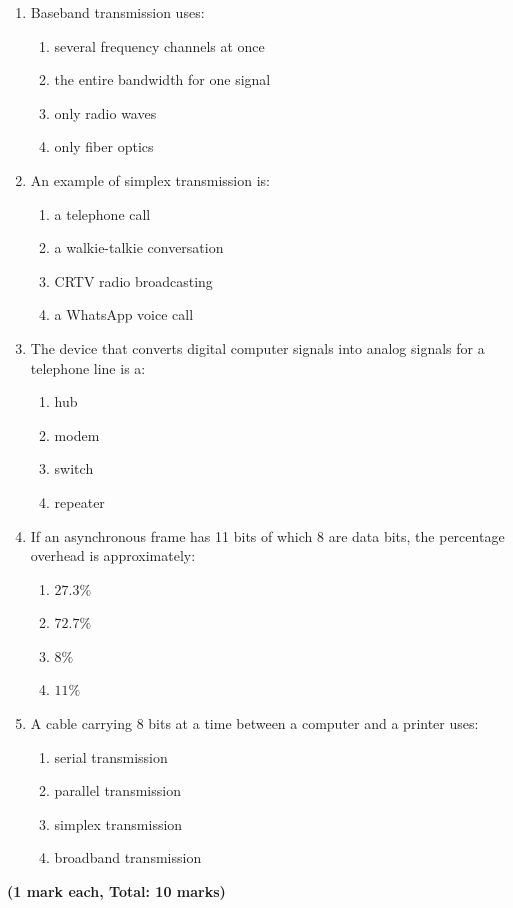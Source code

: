 \documentclass[11pt]{article}
\begin{document}
\begin{exercice}
\begin{enumerate}
\item Baseband transmission uses:
\begin{enumerate}
\item several frequency channels at once
\item the entire bandwidth for one signal
\item only radio waves
\item only fiber optics
\end{enumerate}
\item An example of simplex transmission is:
\begin{enumerate}
\item a telephone call \item a walkie-talkie conversation \item CRTV radio broadcasting \item a WhatsApp voice call
\end{enumerate}
\item The device that converts digital computer signals into analog signals for a telephone line is a:
\begin{enumerate}
\item hub \item modem \item switch \item repeater
\end{enumerate}
\item If an asynchronous frame has 11 bits of which 8 are data bits, the percentage overhead is approximately:
\begin{enumerate}
\item $27.3\%$ \item $72.7\%$ \item $8\%$ \item $11\%$
\end{enumerate}
\item A cable carrying 8 bits at a time between a computer and a printer uses:
\begin{enumerate}
\item serial transmission \item parallel transmission \item simplex transmission \item broadband transmission
\end{enumerate}
\end{enumerate}
\hfill \textbf{(1 mark each, Total: 10 marks)}
\end{exercice}
\end{document}
